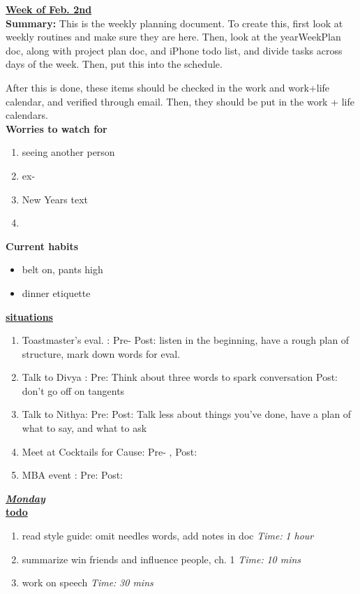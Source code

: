 \documentclass[11pt]{article}
\newcommand{\timeEst}[1]{\textit{Time:} \textit{#1}}
\begin{document}
{\huge{\underline{\textbf{Week of Feb. 2nd}}}} \\

\textbf{Summary:} This is the weekly planning document. To create
this, first look at weekly routines and make sure they are here. Then,
look at the yearWeekPlan doc, along with project plan doc, and iPhone
todo list, and divide tasks across days of the week. Then, put this
into the schedule.

After this is done, these items should be checked in the work and
work+life calendar, and verified through email.
Then, they should be put in the work + life
calendars. \\

\textbf{Worries to watch for} \\
\begin{enumerate}
\item seeing another person
\item ex-
\item New Years text
\item
\end{enumerate}

\textbf{Current habits}\\
\begin{itemize}
\item belt on, pants high
\item dinner etiquette
\end{itemize}

\underline{\textbf{situations}} \\
\begin{enumerate}
\item Toastmaster's eval. :  Pre-     Post: listen in the beginning, have a rough plan of structure, mark down words for eval.
\item Talk to Divya :  Pre: Think about three words to spark conversation    Post: don't go off on tangents
\item Talk to Nithya: Pre:  Post:  Talk less about things you've done, have a plan of what to say, and what to ask
\item Meet at Cocktails for Cause: Pre- ,  Post:
\item MBA event :   Pre:   Post:
\end{enumerate}

\underline{\textbf{\textit{Monday}}}\\
\underline{\textbf{todo}}\\
\begin{enumerate}
\item read style guide:  omit needles words, add notes in doc  \timeEst{1 hour}
\item summarize win friends and influence people, ch. 1 \timeEst{10 mins}
\item work on speech \timeEst{30 mins}
\end{enumerate}
\end{document}
